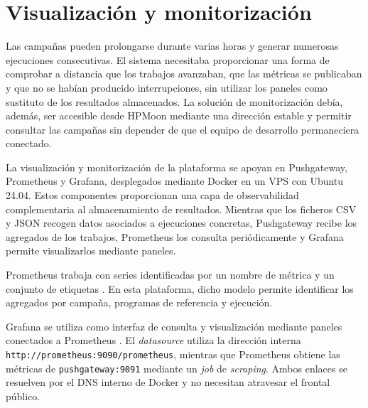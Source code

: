 \section{Visualización y monitorización}
\label{sec:monitorizacion-implementacion}

Las campañas pueden prolongarse durante varias horas y generar numerosas ejecuciones consecutivas. El sistema necesitaba proporcionar una forma de comprobar a distancia que los trabajos avanzaban, que las métricas se publicaban y que no se habían producido interrupciones, sin utilizar los paneles como sustituto de los resultados almacenados. La solución de monitorización debía, además, ser accesible desde HPMoon mediante una dirección estable y permitir consultar las campañas sin depender de que el equipo de desarrollo permaneciera conectado.


La visualización y monitorización de la plataforma se apoyan en Pushgateway, Prometheus y Grafana, desplegados mediante Docker en un VPS con Ubuntu 24.04. Estos componentes proporcionan una capa de observabilidad complementaria al almacenamiento de resultados. Mientras que los ficheros CSV y JSON recogen datos asociados a ejecuciones concretas, Pushgateway recibe los agregados de los trabajos, Prometheus los consulta periódicamente y Grafana permite visualizarlos mediante paneles.

Prometheus trabaja con series identificadas por un nombre de métrica y un conjunto de etiquetas \parencite{prometheusDataModel}. En esta plataforma, dicho modelo permite identificar los agregados por campaña, programas de referencia y ejecución.

Grafana se utiliza como interfaz de consulta y visualización mediante paneles conectados a Prometheus \parencite{grafanaDashboards}. El \emph{datasource} utiliza la dirección interna \texttt{http://prometheus:9090/prometheus}, mientras que Prometheus obtiene las métricas de \texttt{pushgateway:9091} mediante un \emph{job} de \emph{scraping}. Ambos enlaces se resuelven por el DNS interno de Docker y no necesitan atravesar el frontal público.

